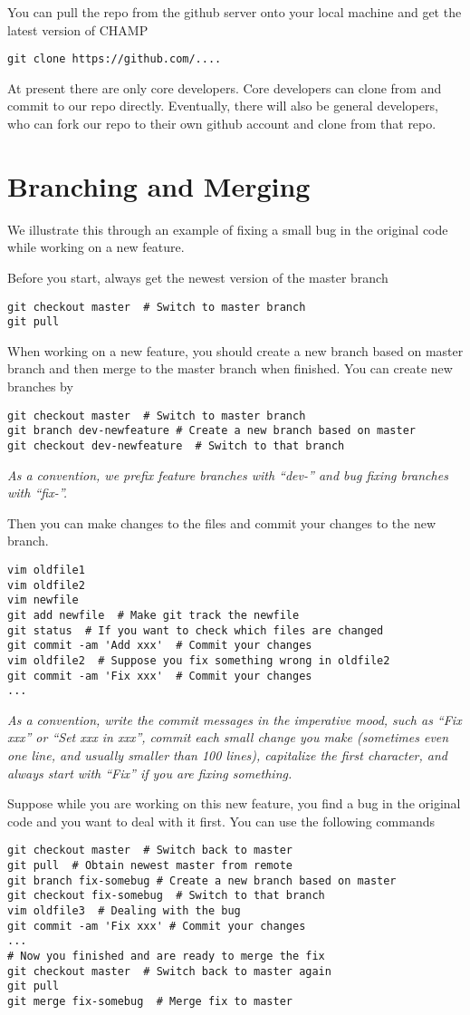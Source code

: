 \documentclass[runningheads,letterpaper]{llncs}
\begin{document}
You can pull the repo from the github server onto your local machine and get the latest version of CHAMP
\begin{verbatim}
git clone https://github.com/....
\end{verbatim}
At present there are only core developers.
Core developers can clone from and commit to our repo directly.
Eventually, there will also be general developers, who can fork our repo to their own github account and clone from that repo.

\section{Branching and Merging}
\label{sec:basic}
We illustrate this through an example of fixing a small bug in the original code while working on a new feature.

Before you start, always get the newest version of the master branch
\begin{verbatim}
git checkout master  # Switch to master branch
git pull
\end{verbatim}

When working on a new feature, you should create a new branch based on master branch and then merge to the master branch when finished.
You can create new branches by
\begin{verbatim}
git checkout master  # Switch to master branch
git branch dev-newfeature # Create a new branch based on master
git checkout dev-newfeature  # Switch to that branch
\end{verbatim}
{\it As a convention, we prefix feature branches with ``dev-'' and bug fixing branches with ``fix-''.}

Then you can make changes to the files and commit your changes to the new branch.
\begin{verbatim}
vim oldfile1
vim oldfile2
vim newfile
git add newfile  # Make git track the newfile
git status  # If you want to check which files are changed
git commit -am 'Add xxx'  # Commit your changes
vim oldfile2  # Suppose you fix something wrong in oldfile2
git commit -am 'Fix xxx'  # Commit your changes
...
\end{verbatim}
{\it As a convention,
write the commit messages in the imperative mood, such as ``Fix xxx'' or ``Set xxx in xxx'',
commit each small change you make (sometimes even one line, and usually smaller than 100 lines),
capitalize the first character,
and always start with ``Fix'' if you are fixing something.}

Suppose while you are working on this new feature, you find a bug in the original code and you want to deal with it first. You can use the following commands
\begin{verbatim}
git checkout master  # Switch back to master
git pull  # Obtain newest master from remote
git branch fix-somebug # Create a new branch based on master
git checkout fix-somebug  # Switch to that branch
vim oldfile3  # Dealing with the bug
git commit -am 'Fix xxx' # Commit your changes
...
# Now you finished and are ready to merge the fix
git checkout master  # Switch back to master again
git pull
git merge fix-somebug  # Merge fix to master
\end{verbatim}
\end{document}
